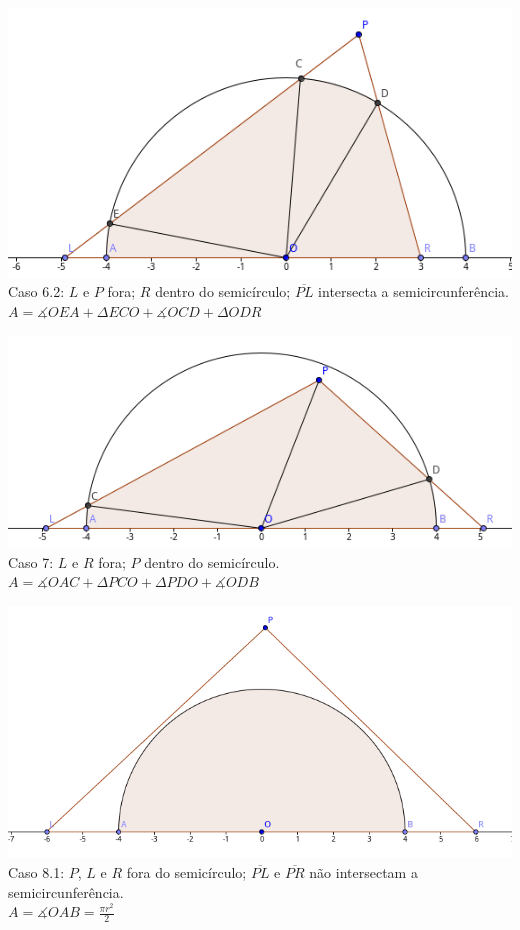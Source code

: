 \begin{center}
    \includegraphics[scale=1.7]{arremesso/editorial-imgs/caso62.png}\\
    Caso 6.2: $L$ e $P$ fora; $R$ dentro do semicírculo; $\overline{PL}$ intersecta a semicircunferência.\\
    $A = \measuredangle OEA + \Delta ECO + \measuredangle OCD + \Delta ODR$
\end{center}

\begin{center}
    \includegraphics[scale=1.7]{arremesso/editorial-imgs/caso7.png}\\
    Caso 7: $L$ e $R$ fora; $P$ dentro do semicírculo.\\
    $A = \measuredangle OAC + \Delta PCO + \Delta PDO + \measuredangle ODB$
\end{center}

\begin{center}
    \includegraphics[scale=1.7]{arremesso/editorial-imgs/caso81.png}\\
    Caso 8.1: $P$, $L$ e $R$ fora do semicírculo; $\overline{PL}$ e $\overline{PR}$ não intersectam a semicircunferência.\\
    $A = \measuredangle OAB = \displaystyle\frac{\pi r^2}{2}$
\end{center}

